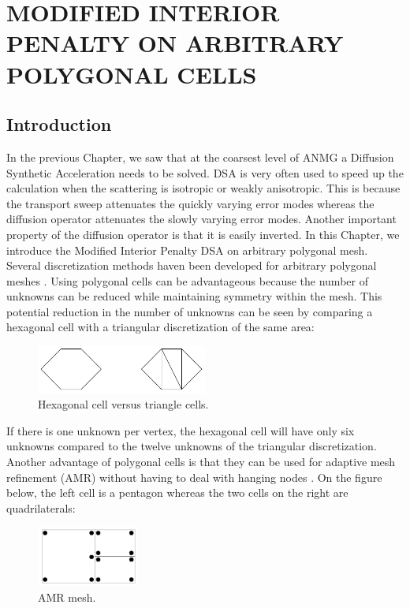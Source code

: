 \chapter{\uppercase{Modified Interior Penalty on Arbitrary Polygonal Cells}}
\section{Introduction}
In the previous Chapter, we saw that at the coarsest level of ANMG a Diffusion
Synthetic Acceleration needs to be solved. DSA is very often used to speed up the
calculation when the scattering is isotropic or weakly anisotropic. This is
because the transport sweep attenuates the quickly varying error modes whereas
the diffusion operator attenuates the slowly varying error modes.  Another
important property of the diffusion operator is that it is easily inverted. 
In this Chapter, we introduce the Modified Interior Penalty DSA on arbitrary 
polygonal mesh. Several discretization methods haven been developed for 
arbitrary polygonal meshes \cite{pwld_3d,pwl_diffusion,palmer_fe,mimetic,
cell_centered_diff,palmer_proc,palmer_ane,pwld_2d,wachspress}. Using polygonal 
cells can be advantageous because the number of unknowns can be reduced while 
maintaining symmetry within the mesh. This potential reduction in the number of 
unknowns can be seen by comparing a hexagonal cell with a triangular 
discretization of the same area:
\begin{figure}[H]
\centering
\includegraphics[width=0.5\textwidth]{./Dsa/hex_tri_cells}
\caption{Hexagonal cell versus triangle cells.}
\end{figure}
If there is one unknown per vertex, the hexagonal cell will have only six
unknowns compared to the twelve unknowns of the triangular discretization. Another 
advantage of polygonal cells is that they can be used for adaptive mesh 
refinement (AMR) \cite{amr_block,amr_rad,amr_unstruc} without having to
deal with hanging nodes \cite{locally_hanging_nodes,arbitrary_hanging_nodes,
dealII_hanging_nodes}. On the figure below, the left cell is a pentagon 
whereas the two cells on the right are quadrilaterals:
\begin{figure}[H]
\centering
\includegraphics[width=0.3\textwidth]{./Dsa/amr}
\caption{AMR mesh.}
\end{figure}
